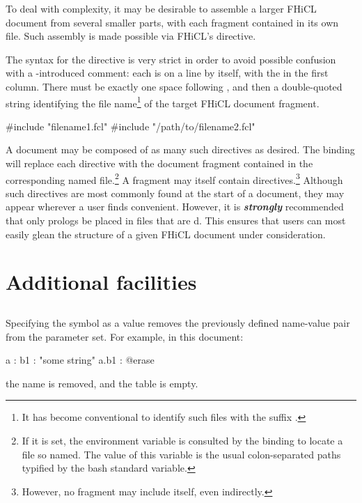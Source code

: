 \documentclass{memarticle}
\makeatletter
\newcommand{\fhicl}{FHiCL\xspace}
\newcommand{\aterase}{\fclcode{@erase}\xspace}
\makeatother
\begin{document}
To deal with complexity, it may be desirable to assemble a larger
\fhicl document from several smaller parts, with each fragment
contained in its own file.  Such assembly is made possible via
\fhicl's  directive.

The syntax for the directive is very strict in order to avoid possible
confusion with a \fclcode{#}-introduced comment: each
 is on a line by itself, with the \fclcode{#} in the
first column.  There must be exactly one space following
, and then a double-quoted string identifying the
file name\footnote{%
  It has become conventional to identify such files with the suffix
  .%
} of the target \fhicl document fragment.  
%
\Needspace{0.34in}
\begin{fcllisting}[texcl,escapechar=`]
#include "filename1.fcl"
#include "/path/to/filename2.fcl"
\end{fcllisting}

A document may be composed of as many such directives as desired.  The
binding will replace each directive with the document fragment
contained in the corresponding named file.\footnote{%
  If it is set, the environment variable  is
  consulted by the binding to locate a file so named.  The value of
  this variable is the usual colon-separated paths typified by the
  bash standard  variable.%
} A fragment may itself contain 
directives.\footnote{%
  However, no fragment may include itself, even indirectly.%
} Although such directives are most commonly found at the start of a
document, they may appear wherever a user finds convenient.  However,
it is \textbf{\textit{strongly}} recommended that only prologs be
placed in files that are d.  This ensures that users
can most easily glean the structure of a given FHiCL document under
consideration.

\chapter{Additional facilities}

\section{\aterase}

Specifying the \aterase symbol as a value removes the previously
defined name-value pair from the parameter set.  For example, in this
document: \Needspace{0.34in}
\begin{fcllisting}[texcl,escapechar=`]
a : {
   b1 : "some string"
}
a.b1 : @erase
\end{fcllisting}
the name  is removed, and the table  is
empty.
\end{document}
